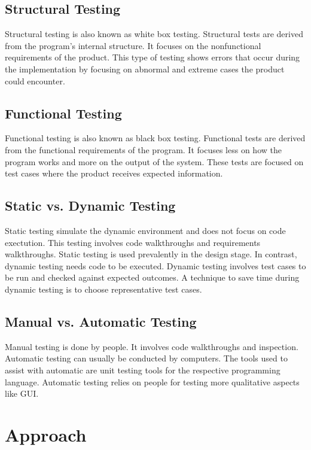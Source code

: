 \documentclass[12pt]{article}
\begin{document}
\subsection{Structural Testing}
Structural testing  is also known as white box testing. Structural tests are derived from the program's internal structure. It focuses on the nonfunctional requirements of the product. This type of testing shows errors that occur during the implementation by focusing on abnormal and extreme cases the product could encounter.
\subsection{Functional Testing}
Functional testing is also known as black box testing. Functional tests are derived from the functional requirements of the program. It focuses less on how the program works and more on the output of the system. These tests are focused on test cases where the product receives expected information.
\subsection{Static vs. Dynamic Testing}
Static testing simulate the dynamic environment and does not focus on code exectution. This testing involves code walkthroughs and requirements walkthroughs. Static testing is used prevalently in the design stage. In contrast, dynamic testing needs code to be executed. \newline\newline
Dynamic testing involves test cases to be run and checked against expected outcomes. A technique to save time during dynamic testing is to choose representative test cases. 
\subsection{Manual vs. Automatic Testing}
Manual testing is done by people. It involves code walkthroughs and inspection. \newline\newline
Automatic testing can usually be conducted by computers. The tools used to assist with automatic are unit testing tools for the respective programming language. Automatic testing relies on people for testing more qualitative aspects like GUI. 


\section{Approach}
\end{document}

